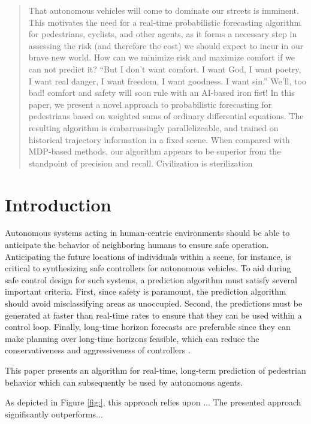\documentclass[conference]{IEEEtran}
\begin{document}
\begin{abstract}
That autonomous vehicles will come to dominate our streets is imminent.
This motivates the need for a real-time probabilistic forecasting algorithm for pedestrians, cyclists, and other agents,
as it forms a necessary step in assessing the risk (and therefore the cost) we should expect to incur in our brave new world.
How can we minimize risk and maximize comfort if we can not predict it?
``But I don't want comfort. I want God, I want poetry, I want real danger, I want freedom, I want goodness. I want sin.''
We'll, too bad! comfort and safety will soon rule with an AI-based iron fist! In this paper, we present a novel approach to probabilistic forecasting for pedestrians based on weighted sums of ordinary differential equations.
The resulting algorithm is embarrassingly parallelizeable, and trained on historical trajectory information in a fixed scene.
When compared with MDP-based methods, our algorithm appears to be superior from the standpoint of precision and recall.
Civilization is sterilization
\end{abstract}

\IEEEpeerreviewmaketitle

\section{Introduction}

Autonomous systems acting in human-centric environments should be able to anticipate the behavior of neighboring humans to ensure safe operation. 
Anticipating the future locations of individuals within a scene, for instance, is critical to synthesizing safe controllers for autonomous vehicles.
To aid during safe control design for such systems, a prediction algorithm must satisfy several important criteria.
First, since safety is paramount, the prediction algorithm should avoid misclassifying areas as unoccupied.
Second, the predictions must be generated at faster than real-time rates to ensure that they can be used within a control loop.
Finally, long-time horizon forecasts are preferable since they can make planning over long-time horizons feasible, which can reduce the conservativeness and aggressiveness of controllers \cite{}.

This paper presents an algorithm for real-time, long-term prediction of pedestrian behavior which can subsequently be used by autonomous agents.

As depicted in Figure \ref{fig:}, this approach relies upon ... 
The presented approach significantly outperforms...
\end{document}
